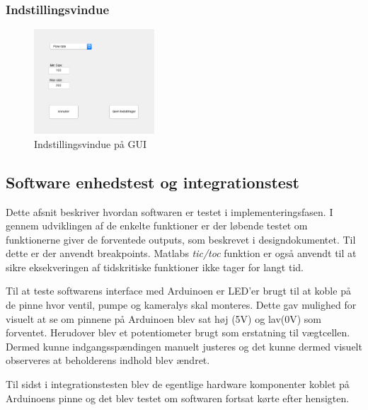 \subsubsection{Indstillingsvindue}
\begin{figure}[H]
	\centering
	\includegraphics[width=0.4\textwidth]{billeder/software/settings.png}
	\caption{Indstillingsvindue på GUI}
	\label{fig:finishedSettings}
\end{figure}


\newpage
\subsection{Software enhedstest og integrationstest}
Dette afsnit beskriver hvordan softwaren er testet i implementeringsfasen. I gennem udviklingen af de enkelte funktioner er der løbende testet om funktionerne giver de forventede outputs, som beskrevet i designdokumentet. Til dette er der anvendt breakpoints. Matlabs \textit{tic/toc} funktion er også anvendt til at sikre eksekveringen af tidskritiske funktioner ikke tager for langt tid. 

Til at teste softwarens interface med Arduinoen er LED'er brugt til at koble på de pinne hvor ventil, pumpe og kameralys skal monteres. Dette gav mulighed for visuelt at se om pinnene på Arduinoen blev sat høj (5V) og lav(0V) som forventet. Herudover blev et potentiometer brugt som erstatning til vægtcellen. Dermed kunne indgangsspændingen manuelt justeres og det kunne dermed visuelt observeres at beholderens indhold blev ændret.

Til sidst i integrationstesten blev de egentlige hardware komponenter koblet på Arduinoens pinne og det blev testet om softwaren fortsat kørte efter hensigten.
%
%
